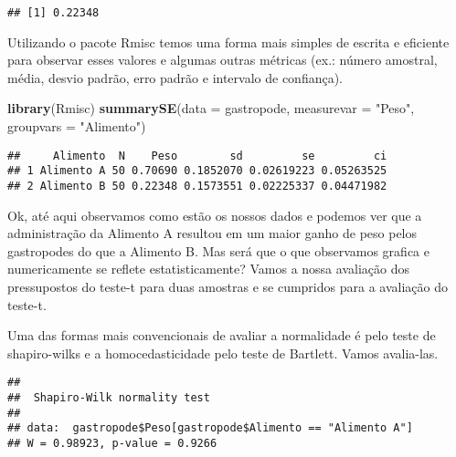 \documentclass[titlepage, oneside, openany, a4paper]{book}
\newenvironment{Shaded}{\begin{snugshade}}{\end{snugshade}}
\newcommand{\DataTypeTok}[1]{\textcolor[rgb]{0.13,0.29,0.53}{#1}}
\newcommand{\KeywordTok}[1]{\textcolor[rgb]{0.13,0.29,0.53}{\textbf{#1}}}
\newcommand{\NormalTok}[1]{#1}
\newcommand{\OperatorTok}[1]{\textcolor[rgb]{0.81,0.36,0.00}{\textbf{#1}}}
\newcommand{\StringTok}[1]{\textcolor[rgb]{0.31,0.60,0.02}{#1}}
\begin{document}
\begin{verbatim}
## [1] 0.22348
\end{verbatim}

Utilizando o pacote Rmisc temos uma forma mais simples de escrita e eficiente para observar esses valores e algumas outras métricas (ex.: número amostral, média, desvio padrão, erro padrão e intervalo de confiança).

\begin{Shaded}
\begin{Highlighting}[]
\KeywordTok{library}\NormalTok{(Rmisc)}
\KeywordTok{summarySE}\NormalTok{(}\DataTypeTok{data =}\NormalTok{ gastropode, }\DataTypeTok{measurevar =} \StringTok{"Peso"}\NormalTok{, }\DataTypeTok{groupvars =} \StringTok{"Alimento"}\NormalTok{)}
\end{Highlighting}
\end{Shaded}

\begin{verbatim}
##     Alimento  N    Peso        sd         se         ci
## 1 Alimento A 50 0.70690 0.1852070 0.02619223 0.05263525
## 2 Alimento B 50 0.22348 0.1573551 0.02225337 0.04471982
\end{verbatim}

Ok, até aqui observamos como estão os nossos dados e podemos ver que a administração da Alimento A resultou em um maior ganho de peso pelos gastropodes do que a Alimento B. Mas será que o que observamos grafica e numericamente se reflete estatisticamente? Vamos a nossa avaliação dos pressupostos do teste-t para duas amostras e se cumpridos para a avaliação do teste-t.

Uma das formas mais convencionais de avaliar a normalidade é pelo teste de shapiro-wilks e a homocedasticidade pelo teste de Bartlett. Vamos avalia-las.

\begin{Shaded}
\end{Shaded}

\begin{verbatim}
## 
##  Shapiro-Wilk normality test
## 
## data:  gastropode$Peso[gastropode$Alimento == "Alimento A"]
## W = 0.98923, p-value = 0.9266
\end{verbatim}
\end{document}
